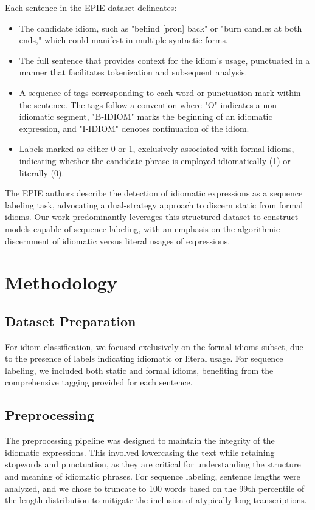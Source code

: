 \documentclass[conference]{IEEEtran}
\begin{document}
Each sentence in the EPIE dataset delineates:
\begin{itemize}
    \item The candidate idiom, such as "behind [pron] back" or "burn candles at both ends," which could manifest in multiple syntactic forms.
    \item The full sentence that provides context for the idiom's usage, punctuated in a manner that facilitates tokenization and subsequent analysis.
    \item A sequence of tags corresponding to each word or punctuation mark within the sentence. The tags follow a convention where "O" indicates a non-idiomatic segment, "B-IDIOM" marks the beginning of an idiomatic expression, and "I-IDIOM" denotes continuation of the idiom.
    \item Labels marked as either 0 or 1, exclusively associated with formal idioms, indicating whether the candidate phrase is employed idiomatically (1) or literally (0).
\end{itemize}

The EPIE authors describe the detection of idiomatic expressions as a sequence labeling task, advocating a dual-strategy approach to discern static from formal idioms. Our work predominantly leverages this structured dataset to construct models capable of sequence labeling, with an emphasis on the algorithmic discernment of idiomatic versus literal usages of expressions.

\section{Methodology}

\subsection{Dataset Preparation}
For idiom classification, we focused exclusively on the formal idioms subset, due to the presence of labels indicating idiomatic or literal usage. For sequence labeling, we included both static and formal idioms, benefiting from the comprehensive tagging provided for each sentence.

\subsection{Preprocessing}
The preprocessing pipeline was designed to maintain the integrity of the idiomatic expressions. This involved lowercasing the text while retaining stopwords and punctuation, as they are critical for understanding the structure and meaning of idiomatic phrases. For sequence labeling, sentence lengths were analyzed, and we chose to truncate to 100 words based on the 99th percentile of the length distribution to mitigate the inclusion of atypically long transcriptions.
\end{document}
